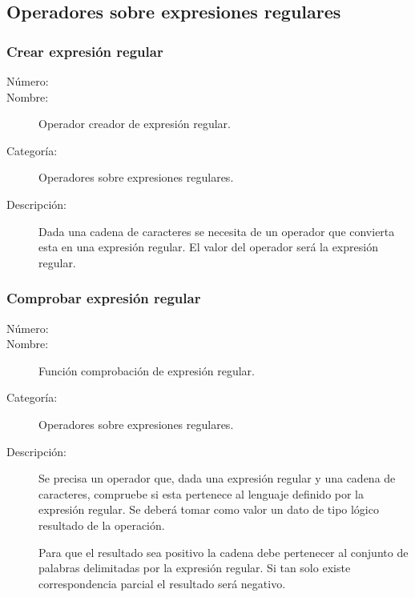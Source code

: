 \subsection{Operadores sobre expresiones regulares}

\subsubsection{Crear expresión regular}
\begin{framed}
	\begin{description}
		\item [Número:] \cn
		\item [Nombre:] Operador creador de expresión regular.
		\item [Categoría:] Operadores sobre expresiones regulares.
		\item [Descripción:] Dada una cadena de caracteres se necesita de un operador que convierta esta en una expresión regular. El
		valor del operador será la expresión regular.
	\end {description}
\end{framed}

\subsubsection{Comprobar expresión regular}
\begin{framed}
	\begin{description}
		\item [Número:] \cn
		\item [Nombre:] Función comprobación de expresión regular.
		\item [Categoría:] Operadores sobre expresiones regulares.
		\item [Descripción:] Se precisa un operador que, dada una expresión regular y una cadena de caracteres,
		compruebe si esta pertenece al lenguaje definido por la expresión regular. Se
		deberá tomar como valor un dato de tipo lógico resultado de la operación.
		
		Para que el resultado sea positivo la cadena debe pertenecer al conjunto de palabras delimitadas
		por la expresión regular. Si tan solo existe correspondencia parcial el resultado será negativo.
	\end {description}
\end{framed}

